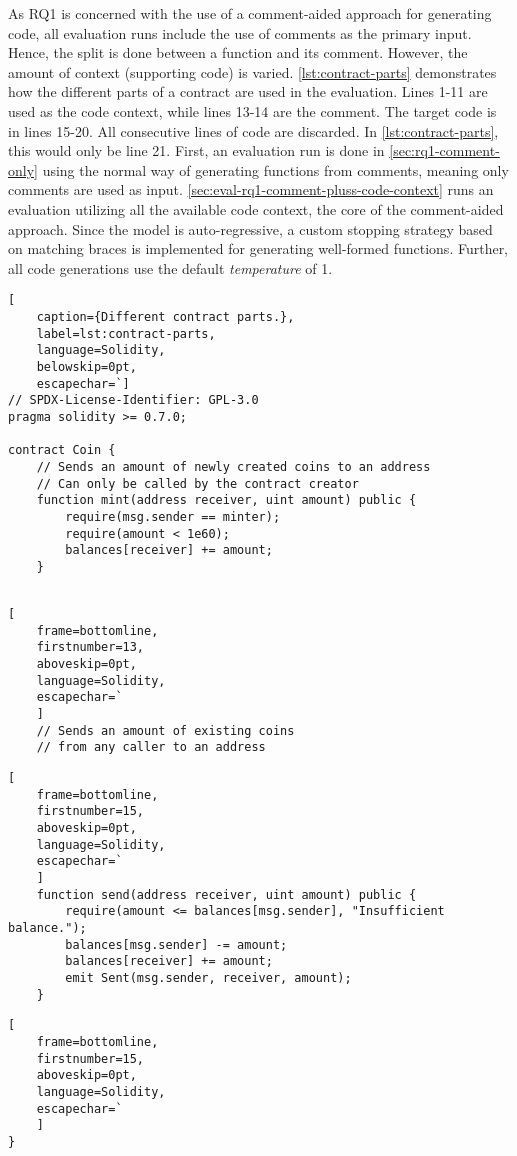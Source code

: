 As RQ1 is concerned with the use of a comment-aided approach for generating code, all evaluation runs include the use of comments as the primary input. Hence, the split is done between a function and its comment. However, the amount of context (supporting code) is varied. \cref{lst:contract-parts} demonstrates how the different parts of a contract are used in the evaluation. Lines 1-11 are used as the code context, while lines 13-14 are the comment. The target code is in lines 15-20. All consecutive lines of code are discarded. In \cref{lst:contract-parts}, this would only be line 21. First, an evaluation run is done in \cref{sec:rq1-comment-only} using the normal way of generating functions from comments, meaning only comments are used as input. \cref{sec:eval-rq1-comment-pluss-code-context} runs an evaluation utilizing all the available code context, the core of the comment-aided approach. Since the model is auto-regressive, a custom stopping strategy based on matching braces is implemented for generating well-formed functions. Further, all code generations use the default \textit{temperature} of 1.

\begin{lstlisting}[
    caption={Different contract parts.},
    label=lst:contract-parts,
    language=Solidity,
    belowskip=0pt,
    escapechar=`]
// SPDX-License-Identifier: GPL-3.0
pragma solidity >= 0.7.0;

contract Coin {
    // Sends an amount of newly created coins to an address
    // Can only be called by the contract creator
    function mint(address receiver, uint amount) public {
        require(msg.sender == minter);
        require(amount < 1e60);
        balances[receiver] += amount;
    }
    
\end{lstlisting}
\begin{lstlisting}[
    frame=bottomline,
    firstnumber=13,
    aboveskip=0pt,
    language=Solidity,
    escapechar=`
    ]
    // Sends an amount of existing coins
    // from any caller to an address
\end{lstlisting}
\begin{lstlisting}[
    frame=bottomline,
    firstnumber=15,
    aboveskip=0pt,
    language=Solidity,
    escapechar=`
    ]
    function send(address receiver, uint amount) public {
        require(amount <= balances[msg.sender], "Insufficient balance.");
        balances[msg.sender] -= amount;
        balances[receiver] += amount;
        emit Sent(msg.sender, receiver, amount);
    }
\end{lstlisting}
\begin{lstlisting}[
    frame=bottomline,
    firstnumber=15,
    aboveskip=0pt,
    language=Solidity,
    escapechar=`
    ]
}
\end{lstlisting}


